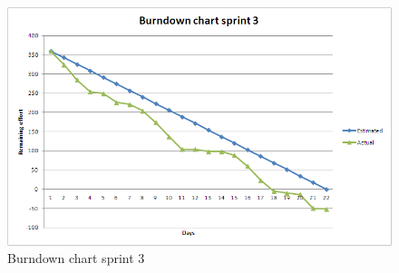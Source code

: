 \begin{figure}[h!]
	\includegraphics[width=\textwidth]{burndown3.png}
	\caption{Burndown chart sprint 3}
	\label{fig:burndown3}
\end{figure}